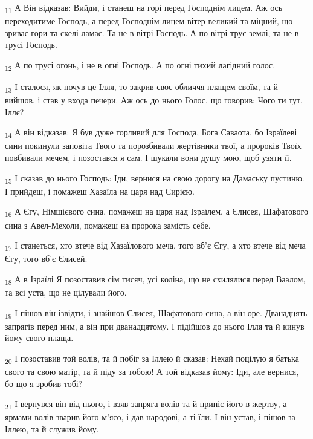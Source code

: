 \begin{tcolorbox}
\textsubscript{11} А Він відказав: Вийди, і станеш на горі перед Господнім лицем. Аж ось переходитиме Господь, а перед Господнім лицем вітер великий та міцний, що зриває гори та скелі ламає. Та не в вітрі Господь. А по вітрі трус землі, та не в трусі Господь.
\end{tcolorbox}
\begin{tcolorbox}
\textsubscript{12} А по трусі огонь, і не в огні Господь. А по огні тихий лагідний голос.
\end{tcolorbox}
\begin{tcolorbox}
\textsubscript{13} І сталося, як почув це Ілля, то закрив своє обличчя плащем своїм, та й вийшов, і став у входа печери. Аж ось до нього Голос, що говорив: Чого ти тут, Іллє?
\end{tcolorbox}
\begin{tcolorbox}
\textsubscript{14} А він відказав: Я був дуже горливий для Господа, Бога Саваота, бо Ізраїлеві сини покинули заповіта Твого та порозбивали жертівники твої, а пророків Твоїх повбивали мечем, і позостався я сам. І шукали вони душу мою, щоб узяти її.
\end{tcolorbox}
\begin{tcolorbox}
\textsubscript{15} І сказав до нього Господь: Іди, вернися на свою дорогу на Дамаську пустиню. І прийдеш, і помажеш Хазаїла на царя над Сирією.
\end{tcolorbox}
\begin{tcolorbox}
\textsubscript{16} А Єгу, Німшієвого сина, помажеш на царя над Ізраїлем, а Єлисея, Шафатового сина з Авел-Мехоли, помажеш на пророка замість себе.
\end{tcolorbox}
\begin{tcolorbox}
\textsubscript{17} І станеться, хто втече від Хазаїлового меча, того вб'є Єгу, а хто втече від меча Єгу, того вб'є Єлисей.
\end{tcolorbox}
\begin{tcolorbox}
\textsubscript{18} А в Ізраїлі Я позоставив сім тисяч, усі коліна, що не схилялися перед Ваалом, та всі уста, що не цілували його.
\end{tcolorbox}
\begin{tcolorbox}
\textsubscript{19} І пішов він ізвідти, і знайшов Єлисея, Шафатового сина, а він оре. Дванадцять запрягів перед ним, а він при дванадцятому. І підійшов до нього Ілля та й кинув йому свого плаща.
\end{tcolorbox}
\begin{tcolorbox}
\textsubscript{20} І позоставив той волів, та й побіг за Іллею й сказав: Нехай поцілую я батька свого та свою матір, та й піду за тобою! А той відказав йому: Іди, але вернися, бо що я зробив тобі?
\end{tcolorbox}
\begin{tcolorbox}
\textsubscript{21} І вернувся він від нього, і взяв запряга волів та й приніс його в жертву, а ярмами волів зварив його м'ясо, і дав народові, а ті їли. І він устав, і пішов за Іллею, та й служив йому.
\end{tcolorbox}
